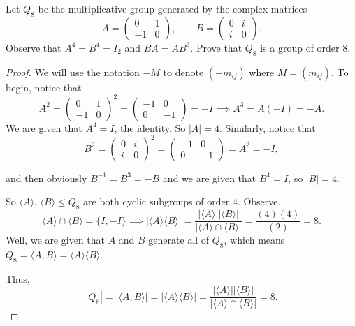 \documentclass[addpoints,10pt]{exam}
\theoremstyle{plain}
\theoremstyle{definition}
\newtheorem{prob}[thm]{Problem}
\theoremstyle{plain}
\theoremstyle{plain}
\theoremstyle{definition}
\let\oldprob\prob
\let\endoldprob\endprob
\renewenvironment{prob}
  {\begin{singlespace}\oldprob}
  {\endoldprob\end{singlespace}}
\newcommand{\class}[2][]{\ensuremath{\left[\,#2\,\right]_{#1}}}
\newcommand{\ZZ}{\ensuremath{\mathbb{Z}}}
\begin{document}


\newpage
\setcounter{thm}{4}   %
\begingroup{}
\begin{prob}
  Let $Q_8$ be the multiplicative group generated by the complex matrices
  \[
  A=\begin{pmatrix}0 & 1 \\ -1 & 0\end{pmatrix},
  \qquad
  B=\begin{pmatrix}0 & i \\ i & 0\end{pmatrix}.
  \]
  Observe that $A^4=B^4=I_2$ and $BA=AB^3$. Prove that $Q_8$ is a group of order $8$.
\end{prob}

\begin{proof} We will use the notation $-M$ to denote $(-m_{ij})$ where $M=(m_{ij})$. To begin, notice that
  $$A^{2}=\begin{pmatrix}
    0 & 1\\
    -1 & 0
  \end{pmatrix}^{2}=\begin{pmatrix}
    -1 & 0 \\
    0 & -1
  \end{pmatrix}=-I\implies A^{3}=A(-I)=-A.$$ We are given that $A^{4}=I$, the identity. So $|A|=4$. Similarly, notice that
  $$B^{2}=\begin{pmatrix}
    0 & i\\
    i & 0
  \end{pmatrix}^{2}=\begin{pmatrix}
    -1 & 0 \\
    0 & -1
  \end{pmatrix}=A^{2}=-I,$$
  
 and then obviously $B^{-1}=B^{3}=-B$ and we are given that $B^{4}=I$, so $|B|=4$. 
 
 So $\langle A\rangle,\,\langle B \rangle \leq Q_{8}$ are both cyclic subgroups of order $4$. Observe.
  $$\langle A\rangle \cap \langle B\rangle = \{I,-I\}\implies |\langle A\rangle\langle B\rangle|=\frac{|\langle A\rangle||\langle B\rangle|}{|\langle A\rangle \cap \langle B\rangle|}=\frac{(4)(4)}{(2)}=8.$$
  Well, we are given that $A$ and $B$ generate all of $Q_{8}$, which means $Q_{8}=\langle A,B\rangle =\langle A\rangle\langle B\rangle$.

  Thus,
  $$|Q_{8}|=|\langle A,B\rangle|=|\langle A\rangle\langle B\rangle|=\frac{|\langle A\rangle||\langle B\rangle|}{|\langle A\rangle \cap \langle B\rangle|}=8.$$
\end{proof}
\newpage
\end{document}
